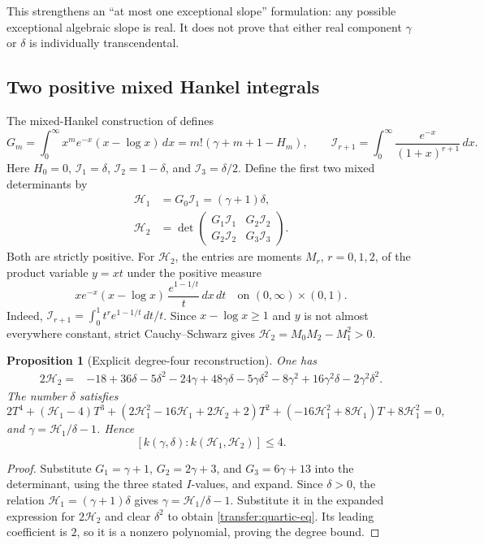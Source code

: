 \documentclass[11pt]{article}
\newtheorem{proposition}[theorem]{Proposition}
\theoremstyle{definition}
\theoremstyle{remark}
\begin{document}
This strengthens an ``at most one exceptional slope'' formulation: any
possible exceptional algebraic slope is real. It does not prove that either
real component $\gamma$ or $\delta$ is individually transcendental.

\subsection{Two positive mixed Hankel integrals}

The mixed-Hankel construction of \cite{Periods} defines
\[
 G_m=\int_0^\infty x^m e^{-x}(x-\log x)\,dx
     =m!(\gamma+m+1-H_m),\qquad
 \mathcal I_{r+1}=\int_0^\infty\frac{e^{-x}}{(1+x)^{r+1}}\,dx.
\]
Here $H_0=0$, $\mathcal I_1=\delta$, $\mathcal I_2=1-\delta$, and $\mathcal I_3=\delta/2$.
Define the first two mixed determinants by
\begin{align*}
 \mathcal H_1&=G_0\mathcal I_1=(\gamma+1)\delta,\\
 \mathcal H_2&=\det\begin{pmatrix}G_1\mathcal I_1&G_2\mathcal I_2\\G_2\mathcal I_2&G_3\mathcal I_3\end{pmatrix}.
\end{align*}
Both are strictly positive. For $\mathcal H_2$, the entries are moments $M_r$,
$r=0,1,2$, of the product variable $y=xt$ under the positive measure
\[
 x e^{-x}(x-\log x)\,\frac{e^{1-1/t}}t\,dx\,dt
 \quad\text{on }(0,\infty)\times(0,1).
\]
Indeed, $\mathcal I_{r+1}=\int_0^1 t^r e^{1-1/t}\,dt/t$. Since $x-\log x\ge1$ and
$y$ is not almost everywhere constant, strict Cauchy--Schwarz gives
$\mathcal H_2=M_0M_2-M_1^2>0$.

\begin{proposition}[Explicit degree-four reconstruction]\label{transfer:quartic}
One has
\begin{align*}
 2\mathcal H_2={}&-18+36\delta-5\delta^2-24\gamma+48\gamma\delta
       -5\gamma\delta^2-8\gamma^2+16\gamma^2\delta
       -2\gamma^2\delta^2.
\end{align*}
The number $\delta$ satisfies
\begin{equation}\label{transfer:quartic-eq}
 2T^4+(\mathcal H_1-4)T^3+(2\mathcal H_1^2-16\mathcal H_1+2\mathcal H_2+2)T^2
       +(-16\mathcal H_1^2+8\mathcal H_1)T+8\mathcal H_1^2=0,
\end{equation}
and $\gamma=\mathcal H_1/\delta-1$. Hence
\[
 [k(\gamma,\delta):k(\mathcal H_1,\mathcal H_2)]\le4.
\]
\end{proposition}
\begin{proof}
Substitute $G_1=\gamma+1$, $G_2=2\gamma+3$, and
$G_3=6\gamma+13$ into the determinant, using the three stated $I$-values,
and expand. Since $\delta>0$, the relation $\mathcal H_1=(\gamma+1)\delta$ gives
$\gamma=\mathcal H_1/\delta-1$. Substitute it in the expanded expression for $2\mathcal H_2$
and clear $\delta^2$ to obtain \eqref{transfer:quartic-eq}. Its leading
coefficient is $2$, so it is a nonzero polynomial, proving the degree bound.
\end{proof}
\end{document}
